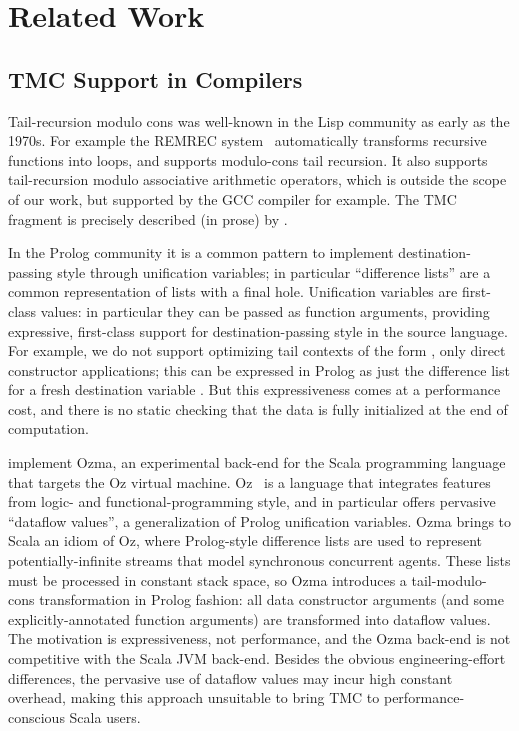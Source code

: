 \section{Related Work}

\subsection{TMC Support in Compilers}

Tail-recursion modulo cons was well-known in the Lisp community as
early as the 1970s. For example the REMREC system~\citep*{risch-73}
automatically transforms recursive functions into loops, and
supports modulo-cons tail recursion. It also supports tail-recursion
modulo associative arithmetic operators, which is outside the scope
of our work, but supported by the GCC compiler for example. The TMC
fragment is precisely described (in prose) by \citet*{friedman-wise-75}.

In the Prolog community it is a common pattern to implement destination-passing style through unification variables; in particular ``difference lists'' are a common representation of lists with a final hole.
Unification variables are first-class values: in particular they can be passed as function arguments, providing expressive, first-class support for destination-passing style in the source language.
For example, we do not support optimizing tail contexts of the form , only direct constructor applications; this can be expressed in Prolog as just the difference list  for a fresh destination variable .
But this expressiveness comes at a performance cost, and there is no static checking that the data is fully initialized at the end of computation.

\citet*{tmc-scala-2013} implement Ozma, an experimental back-end for
the Scala programming language that targets the Oz virtual machine.
Oz~\citep*{oz-1994,oz-1995} is a language that integrates features
from logic- and functional-programming style, and in particular offers
pervasive ``dataflow values'', a generalization of Prolog unification
variables. Ozma brings to Scala an idiom of Oz, where Prolog-style
difference lists are used to represent potentially-infinite streams
that model synchronous concurrent agents. These lists must be
processed in constant stack space, so Ozma introduces
a tail-modulo-cons transformation in Prolog fashion: all data
constructor arguments (and some explicitly-annotated
function arguments) are transformed into dataflow values. The
motivation is expressiveness, not performance, and the Ozma back-end is
not competitive with the Scala JVM back-end. Besides the obvious
engineering-effort differences, the pervasive use of dataflow values
may incur high constant overhead, making this approach unsuitable to
bring TMC to performance-conscious Scala users.

